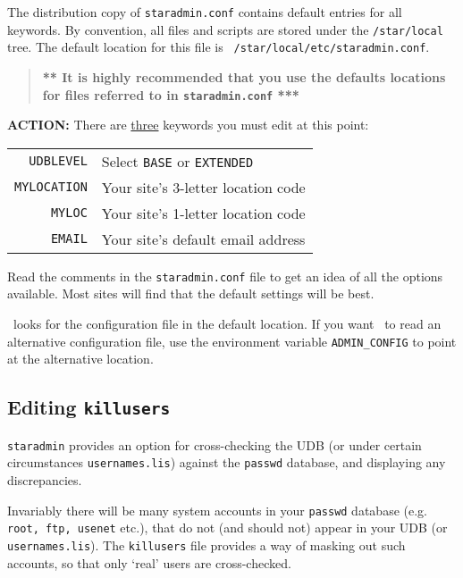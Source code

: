 The distribution copy of {\tt staradmin.conf} contains default entries for
all keywords. By convention, all files and scripts are stored under the
{\tt /star/local} tree. The default location for this file is {\tt
/star/local/etc/staradmin.conf}.

\begin{quote}
  {\bf *** It is highly recommended that you use the defaults locations for
           files referred to in {\tt staradmin.conf} *** }
\end{quote}

{\large\bf ACTION:} There are \underline{three} keywords you must edit at
this point:

\begin{table}[ht]
\centering
\begin{tabular}{rl}
{\tt UDBLEVEL}   & Select {\tt BASE} or {\tt EXTENDED} \\
{\tt MYLOCATION} & Your site's 3-letter location code \\
{\tt MYLOC}      & Your site's 1-letter location code \\
{\tt EMAIL}      & Your site's default email address \\
\end{tabular}
\end{table}

Read the comments in the {\tt staradmin.conf} file to get an idea of all
the options available. Most sites will find that the default settings will
be best.

\staradmin\ looks for the configuration file in the default
location. If you want \staradmin\ to read an alternative configuration file,
use the environment variable {\tt ADMIN\_CONFIG} to point at the alternative
location.

\subsection{Editing {\tt killusers}}
\label{killusers}

{\tt staradmin} provides an option for cross-checking the UDB (or under certain
circumstances {\tt usernames.lis}) against the {\tt passwd} database, and
displaying any discrepancies.

Invariably there will be many system accounts in your {\tt passwd} database
(e.g. {\tt root, ftp, usenet} etc.), that do not (and should not) appear in
your UDB (or {\tt usernames.lis}).  The {\tt killusers} file provides a way of
masking out such accounts, so that only `real' users are cross-checked.

